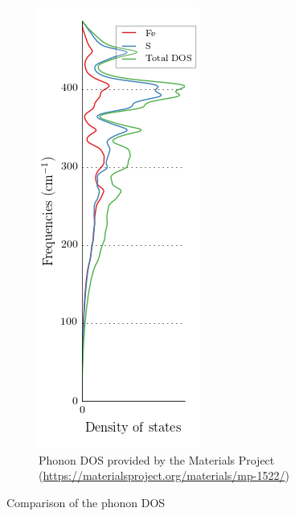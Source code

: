 \documentclass[11pt,a4paper]{article}
\begin{document}
\begin{figure}
\hfill
\begin{subfigure}[b]{0.35\textwidth}
\centering
\includegraphics[width=\textwidth]{images/phonon_dos.png}
\caption{Phonon DOS provided by the Materials Project (\url{https://materialsproject.org/materials/mp-1522/})}
\label{fig:phonondos2}
\end{subfigure}
\caption{Comparison of the phonon DOS}
\label{fig:phonondos}
\end{figure}
\end{document}
